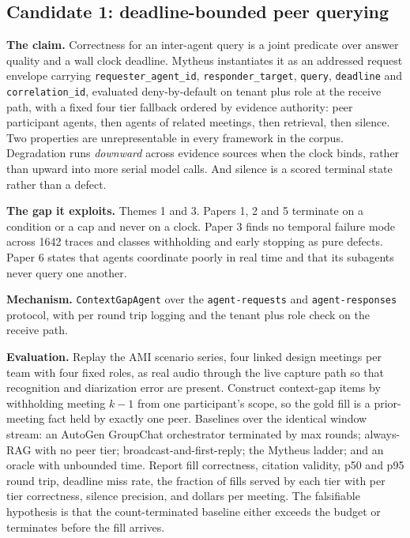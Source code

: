 \subsection{Candidate 1: deadline-bounded peer querying}

\textbf{The claim.} Correctness for an inter-agent query is a joint predicate
over answer quality and a wall clock deadline. Mytheus instantiates it as an
addressed request envelope carrying \texttt{requester\_agent\_id},
\texttt{responder\_target}, \texttt{query}, \texttt{deadline} and
\texttt{correlation\_id}, evaluated deny-by-default on tenant plus role at the
receive path, with a fixed four tier fallback ordered by evidence authority:
peer participant agents, then agents of related meetings, then retrieval, then
silence. Two properties are unrepresentable in every framework in the corpus.
Degradation runs \emph{downward} across evidence sources when the clock binds,
rather than upward into more serial model calls. And silence is a scored
terminal state rather than a defect.

\textbf{The gap it exploits.} Themes 1 and 3. Papers 1, 2 and 5 terminate on a
condition or a cap and never on a clock. Paper 3 finds no temporal failure mode
across 1642 traces and classes withholding and early stopping as pure defects.
Paper 6 states that agents coordinate poorly in real time and that its
subagents never query one another.

\textbf{Mechanism.} \texttt{ContextGapAgent} over the
\texttt{agent-requests} and \texttt{agent-responses} protocol, with per round
trip logging and the tenant plus role check on the receive path.

\textbf{Evaluation.} Replay the AMI scenario series, four linked design
meetings per team with four fixed roles, as real audio through the live capture
path so that recognition and diarization error are present. Construct
context-gap items by withholding meeting $k-1$ from one participant's scope, so
the gold fill is a prior-meeting fact held by exactly one peer. Baselines over
the identical window stream: an AutoGen GroupChat orchestrator terminated by
max rounds; always-RAG with no peer tier; broadcast-and-first-reply; the
Mytheus ladder; and an oracle with unbounded time. Report fill correctness,
citation validity, p50 and p95 round trip, deadline miss rate, the fraction of
fills served by each tier with per tier correctness, silence precision, and
dollars per meeting. The falsifiable hypothesis is that the count-terminated
baseline either exceeds the budget or terminates before the fill arrives.

